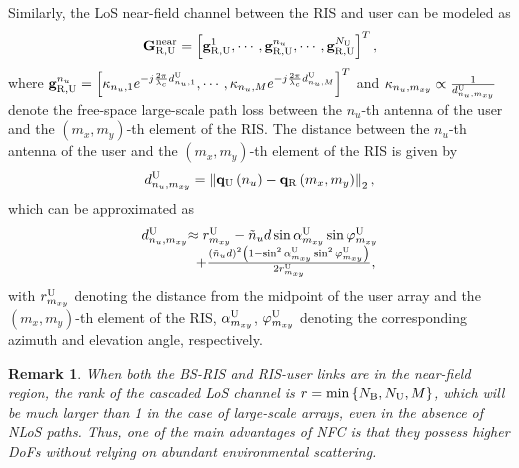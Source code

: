 \documentclass[lettersize, journal]{IEEEtran}
\newtheorem{myRemark}{Remark}
\begin{document}
Similarly, the LoS near-field channel between the RIS and user can be modeled as
\begin{equation}
{{\bf{G}}_{{\rm{R}}, {\rm{U}}}^{\rm{near}}} = \left[ {\bf{g}}_{{\rm{R}}, {\rm{U}}}^1, \cdots, {\bf{g}}_{{\rm{R}}, {\rm{U}}}^{n_u}, \cdots, {\bf{g}}_{{\rm{R}}, {\rm{U}}}^{N_{\rm{U}}} \right]^T, 
\end{equation}
where ${\bf{g}}_{{\rm{R}}, {\rm{U}}}^{n_u} = \left[ \kappa_{n_u, 1} e^{-j\frac{{2\pi }}{\lambda_c }d_{n_u,1}^{\rm{U}}}, \cdots,  \kappa_{n_u, M} e^{-j\frac{{2\pi }}{\lambda_c }d_{n_u, M}^{\rm{U}}} \right] ^T $ and $\kappa_{n_u, m_{xy}} \propto \frac{1}{ d_{n_u, m_{xy}}^{\rm{U}}}$ denote the free-space large-scale path loss between the $n_u$-th antenna of the user and the $\left( m_x, m_y\right)$-th element of the RIS. 
The distance between the $n_u$-th antenna of the user and the $\left( m_x, m_y\right)$-th element of the RIS is given by
\begin{equation}
d_{n_u, m_{xy}}^{\rm{U}} = \left \| {\bf{q}}_{\rm{U}}\left( n_u \right) - {\bf{q}}_{\rm{R}}\left( m_x, m_y \right) \right \|_2,
\end{equation}
which can be approximated as  
\begin{equation}
\begin{array}{l}
d_{n_u, m_{xy}}^{\rm{U}} {\approx } \; r_{m_{xy}}^{\rm{U}}  - {{\tilde n}_u}d \sin\alpha_{m_{xy}}^{\rm{U}} \sin \varphi_{m_{xy}}^{\rm{U}} \\
\;\;\;\;\;\;\;\;\;\;\;\;\;\; + \frac{\left( {{\tilde n}_u}d \right)^2 \left( 1 - \sin^2\alpha_{m_{xy}}^{\rm{U}} \sin^2 \varphi_{m_{xy}}^{\rm{U}}\right) }{2r_{m_{xy}}^{\rm{U}}},
\end{array}
\end{equation}
with $r_{m_{xy}}^{\rm{U}}$ denoting the distance from the midpoint of the user array and the $\left( m_x, m_y\right)$-th element of the RIS, $\alpha_{m_{xy}}^{\rm{U}}$, $\varphi_{m_{xy}}^{\rm{U}}$ denoting the corresponding azimuth and elevation angle, respectively.

\begin{myRemark} \label{Remark_NearFieldRank}
When both the BS-RIS and RIS-user links are in the near-field region, the rank of the cascaded LoS channel is $r =\min \left\{ N_{\rm{B}}, N_{\rm{U}}, M \right\}$, which will be much larger than 1 in the case of large-scale arrays, even in the absence of NLoS paths.
Thus, one of the main advantages of NFC is that they possess higher DoFs without relying on abundant environmental scattering.
\end{myRemark}
\end{document}
